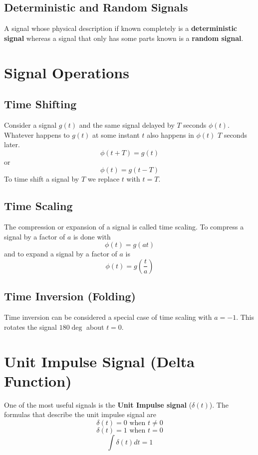 \documentclass{article}
\begin{document}
    \subsection{Deterministic and Random Signals}
    A signal whose physical description if known completely is a \textbf{deterministic signal} whereas a signal that only has some parts known is a 
    \textbf{random signal}.

    \section{Signal Operations}
    \subsection{Time Shifting}
    Consider a signal $g(t)$ and the same signal delayed by $T$ seconds $\phi (t)$. Whatever happens to $g(t)$ at some instant $t$ also happens in $\phi(t)$
    $T$ seconds later.
    \begin{equation}
        \phi (t + T) = g(t) 
    \end{equation}
    or 
    \begin{equation}
        \phi(t) = g(t-T)
    \end{equation}
    To time shift a signal by $T$ we replace $t$ with $t=T$. 

    \subsection{Time Scaling}
    The compression or expansion of a signal is called time scaling. To compress a signal by a factor of $a$ is done with
    \begin{equation}
        \phi (t) = g(at)
    \end{equation}
    and to expand a signal by a factor of $a$ is
    \begin{equation}
        \phi(t) = g(\frac{t}{a})
    \end{equation}

    \subsection{Time Inversion (Folding)}
    Time inversion can be considered a special case of time scaling with $a = -1$. This rotates the signal $180 \deg$ about $t = 0$. 

    \section{Unit Impulse Signal (Delta Function)}
    One of the most useful signals is the \textbf{Unit Impulse signal} ($\delta(t)$). The formulas that describe the unit impulse signal are
    \begin{equation}
        \delta (t) = 0 \textrm{ when } t \neq 0
    \end{equation}
    \begin{equation}
        \delta (t) = 1 \textrm{ when } t = 0
    \end{equation}
    \begin{equation}
        \int \delta (t)dt = 1
    \end{equation}
\end{document}
